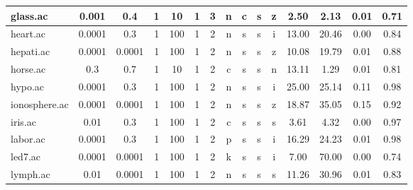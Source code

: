 \begin{table}[htbp]
{\begin{tabular}{|l|c|c|c|c|c|c|c|c|c|c||c|c|c|c|}
		\hline
		glass.ac       & 0.001    & 0.4         & 1              & 10                  & 1             & 3        & n             & c      & s        & z        & 2.50           & 2.13           & 0.01           & 0.71           \\
		\hline
		heart.ac       & 0.0001   & 0.3         & 1              & 100                 & 1             & 2        & n             & s      & s        & i        & 13.00          & 20.46          & 0.00           & 0.84           \\
		\hline
		hepati.ac      & 0.0001   & 0.0001      & 1              & 100                 & 1             & 2        & n             & s      & s        & z        & 10.08          & 19.79          & 0.01           & 0.88           \\
		\hline
		horse.ac       & 0.3      & 0.7         & 1              & 10                  & 1             & 2        & c             & s      & s        & n        & 13.11          & 1.29           & 0.01           & 0.81           \\
		\hline
		hypo.ac        & 0.0001   & 0.3         & 1              & 100                 & 1             & 2        & n             & s      & s        & i        & 25.00          & 25.14          & 0.11           & 0.98           \\
		\hline
		ionosphere.ac  & 0.0001   & 0.0001      & 1              & 100                 & 1             & 2        & n             & s      & s        & z        & 18.87          & 35.05          & 0.15           & 0.92           \\
		\hline
		iris.ac        & 0.01     & 0.3         & 1              & 100                 & 1             & 2        & c             & s      & s        & s        & 3.61           & 4.32           & 0.00           & 0.97           \\
		\hline
		labor.ac       & 0.0001   & 0.3         & 1              & 100                 & 1             & 2        & p             & s      & s        & i        & 16.29          & 24.23          & 0.01           & 0.98           \\
		\hline
		led7.ac        & 0.0001   & 0.0001      & 1              & 100                 & 1             & 2        & k             & s      & s        & i        & 7.00           & 70.00          & 0.00           & 0.74           \\
		\hline
		lymph.ac       & 0.01     & 0.0001      & 1              & 100                 & 1             & 2        & n             & s      & s        & s        & 11.26          & 30.96          & 0.01           & 0.83           \\

\end{tabular}}
\end{table}
